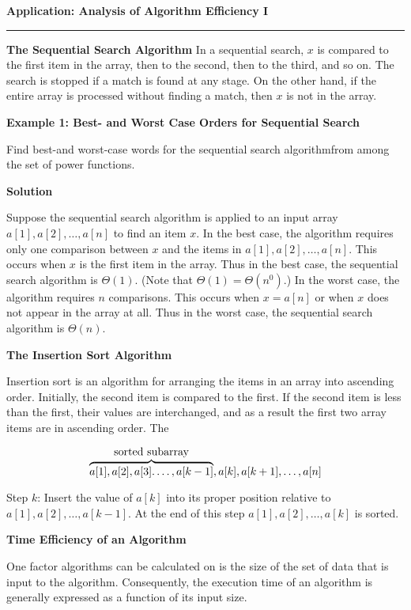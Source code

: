 {\bf Application: Analysis of Algorithm Efficiency I}
\vskip 1mm
\hrule

\vskip 3mm
{\bf The Sequential Search Algorithm}
\vskip 1mm
In a sequential search, $x$ is compared to the first item in the array, then to the second, then to the third, and so on. The search is stopped if a match is found at any stage. On the other hand, if the entire array is processed without finding a match, then $x$ is not in the array.

\filbreak
\vskip 1cm
{\bf Example 1: Best- and Worst Case Orders for Sequential Search}

\vskip 1mm
Find best-and worst-case words for the sequential search algorithmfrom among the set of power functions.

\vskip 3mm
{\bf Solution}

\vskip 1mm
Suppose the sequential search algorithm is applied to an input array $a[1], a[2],\ldots,a[n]$ to find an item $x$. In the best case, the algorithm requires only one comparison between $x$ and the items in $a[1],a[2],\ldots,a[n]$. This occurs when $x$ is the first item in the array. Thus in the best case, the sequential search algorithm is $\Theta(1)$. (Note that $\Theta(1)=\Theta(n^0)$.) In the worst case, the algorithm requires $n$ comparisons. This occurs when $x=a[n]$ or when $x$ does not appear in the array at all. Thus in the worst case, the sequential search algorithm is $\Theta(n)$.

\filbreak
\vskip 1cm
{\bf The Insertion Sort Algorithm}

\vskip 1mm
Insertion sort is an algorithm for arranging the items in an array into ascending order. Initially, the second item is compared to the first. If the second item is less than the first, their values are interchanged, and as a result the first two array items are in ascending order. The

$$\overbrace{a[1],a[2],a[3].\ldots,a[k-1]}^{\hbox{sorted subarray}},a[k],a[k+1],\ldots,a[n]$$

Step $k$: Insert the value of $a[k]$ into its proper position relative to $a[1],a[2],\ldots,a[k-1]$. At the end of this step $a[1],a[2],\ldots,a[k]$ is sorted.

\filbreak
\vskip 1cm
{\bf Time Efficiency of an Algorithm}

\vskip 1mm
One factor algorithms can be calculated on is the size of the set of data that is input to the algorithm. Consequently, the execution time of an algorithm is generally expressed as a function of its input size.

